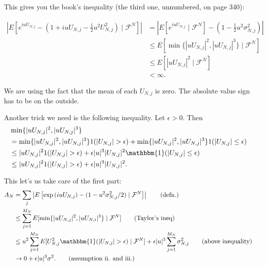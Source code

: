 \documentclass{article}
\begin{document}
This gives you the book's inequality (the third one, unnumbered, on page 340):

\begin{align*}
\left| E\left[e^{i u U_{N,j}} - (1 +i u U_{N,j} - \frac{1}{2} u^2 U_{N,j}^2) \mid \mathcal{F}^N \right]  \right| 
&= \left| E\left[e^{i u U_{N,j}}\mid \mathcal{F}^N \right] - (1  - \frac{1}{2} u^2 \sigma^2_{N,j})   \right|\\
&\le E\left[ \min\{| u U_{N,j}|^2, | u U_{N,j}|^3 \} \mid \mathcal{F}^N \right] \\
&\le E\left[ | u U_{N,j}|^2 \mid \mathcal{F}^N \right] \\
&<\infty \tag{assumption}.
\end{align*}

We are using the fact that the mean of each $U_{N,j}$ is zero. The absolute value sign has to be on the outside.

Another trick we need is the following inequality. Let $\epsilon > 0$. Then
\begin{align*}
&\min\{|uU_{N,j} |^2, |uU_{N,j}|^3 \} \\
&=\min\{|uU_{N,j} |^2, |uU_{N,j}|^3 \}  1(|U_{N,j}| > \epsilon) + \min\{|uU_{N,j} |^2, |uU_{N,j}|^3 \}  1(|U_{N,j}| \le \epsilon) \\
&\le |uU_{N,j} |^2 1(|U_{N,j}| > \epsilon) + \epsilon|u|^3 |U_{N,j}|^2  \mathbbm{1}(|U_{N,j}| \le \epsilon) \\
&\le |uU_{N,j} |^2 1(|U_{N,j}| > \epsilon) + \epsilon|u|^3 |U_{N,j}|^2. 
\end{align*}


This let's us take care of the first part:
\begin{align*}
A_N &= \sum_j \left| E\left[   \exp\left( i u U_{N,j} \right)  - (1 - u^2 \sigma^2_{N,j}/2) \mid \mathcal{F}^N \right] \right| \tag{defn.} \\
&\le \sum_{j=1}^{M_N} E[ \min\{|uU_{N,j} |^2, |uU_{N,i}|^3 \} \mid \mathcal{F}^N ] \tag{Taylor's ineq} \\
&\le u^2 \sum_{j=1}^{M_N} E[ U_{N,j}^2 \mathbbm{1}(|U_{N,j}| > \epsilon) \mid \mathcal{F}^N ] + \epsilon |u|^3 \sum_{j=1}^{M_N} \sigma^2_{N,j} \tag{above inequality} \\
&\to 0 + \epsilon |u|^3 \sigma^2. \tag{assumption ii. and iii.}
\end{align*}
\end{document}
